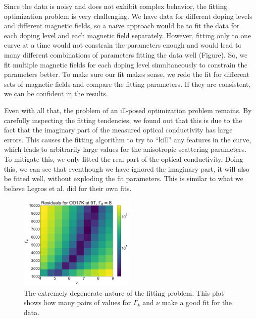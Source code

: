 Since the data is noisy and does not exhibit complex behavior, the fitting optimization problem is
very challenging. We have data for different doping levels and different magnetic fields, so a
naïve approach would be to fit the data for each doping level and each magnetic field separately.
However, fitting only to one curve at a time would not constrain the parameters enough and would
lead to many different combinations of parameters fitting the data well (Figure). So, we fit multiple
magnetic fields for each doping level simultaneously to constrain the parameters better. To make
sure our fit makes sense, we redo the fit for different sets of magnetic fields and compare the
fitting parameters. If they are consistent, we can be confident in the results.

Even with all that, the problem of an ill-posed optimization problem remains. By carefully
inspecting the fitting tendencies, we found out that this is due to the fact that the imaginary
part of the measured optical conductivity has large errors. This causes the fitting algorithm to
try to ``kill'' any features in the curve, which leads to arbitrarily large values for the
anisotropic scattering parameters. To mitigate this, we only fitted the real part of the optical
conductivity. Doing this, we can see that eventhough we have ignored the imaginary part, it will
also be fitted well, without exploding the fit parameters. This is similar to what we believe
Legros et al. did for their own fits.

\begin{figure}
    \centering
    \includegraphics[width=0.5\textwidth]{figures/residuals_degenerate}
    \caption{The extremely degenerate nature of the fitting problem. This plot shows how many pairs
        of values for $\Gamma_k$ and $\nu$ make a good fit for the data.}
    \label{fig:residuals_degenerate}
\end{figure}
